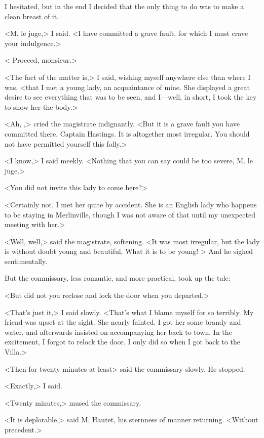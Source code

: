  I hesitated, but in the end I decided that the only thing to do was to make a clean breast of it. 

 <M. le juge,> I said. <I have committed a grave fault, for which I must crave your indulgence.> 

 < Proceed, monsieur.> 

 <The fact of the matter is,> I said, wishing myself anywhere else than where I was, <that I met a young lady, an acquaintance of mine. She displayed a great desire to see everything that was to be seen, and I—well, in short, I took the key to show her the body.> 

 <Ah, ,> cried the magistrate indignantly. <But it is a grave fault you have committed there, Captain Hastings. It is altogether most irregular. You should not have permitted yourself this folly.> 

 <I know,> I said meekly. <Nothing that you can say could be too severe, M. le juge.> 

 <You did not invite this lady to come here?> 

 <Certainly not. I met her quite by accident. She is an English lady who happens to be staying in Merlinville, though I was not aware of that until my unexpected meeting with her.> 

 <Well, well,> said the magistrate, softening. <It was most irregular, but the lady is without doubt young and beautiful,  What it is to be young! > And he sighed sentimentally. 

 But the commissary, less romantic, and more practical, took up the tale: 

 <But did not you reclose and lock the door when you departed.> 

 <That's just it,> I said slowly. <That's what I blame myself for so terribly. My friend was upset at the sight. She nearly fainted. I got her some brandy and water, and afterwards insisted on accompanying her back to town. In the excitement, I forgot to relock the door. I only did so when I got back to the Villa.> 

 <Then for twenty minutes at least\longdash> said the commissary slowly. He stopped. 

 <Exactly,> I said. 

 <Twenty minutes,> mused the commissary. 

 <It is deplorable,> said M. Hautet, his sternness of manner returning. <Without precedent.> 

